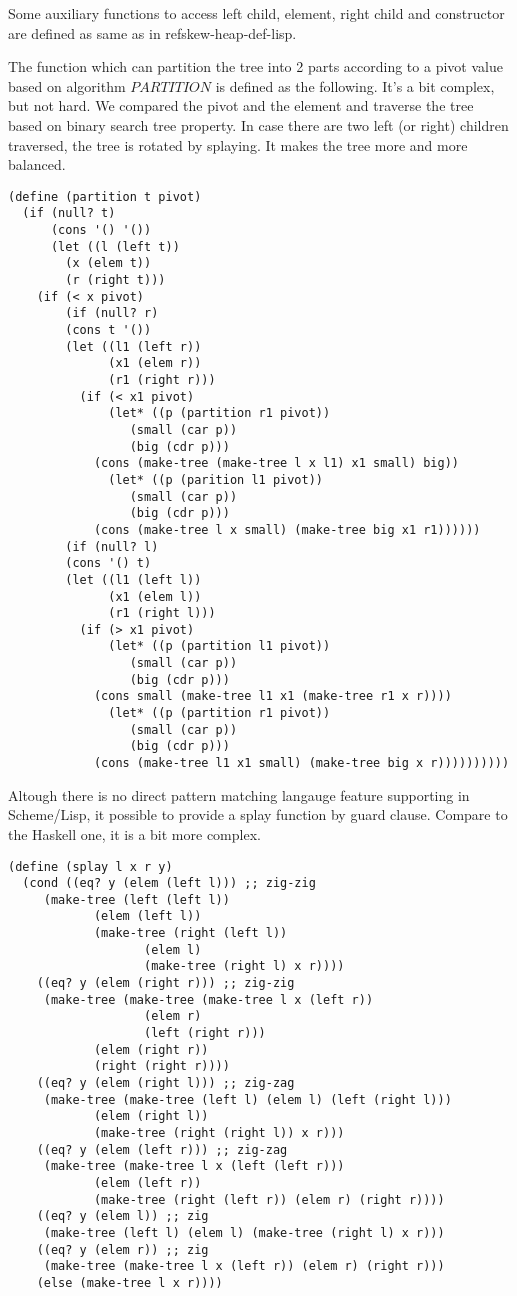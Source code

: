 \documentclass{article}
\begin{document}
Some auxiliary functions to access left child, element, right
child and constructor are defined as same as in ref{skew-heap-def-lisp}.

The function which can partition the tree into 2 parts according to 
a pivot value based on algorithm $PARTITION$ is defined as the following.
It's a bit complex, but not hard. We compared the pivot and the element
and traverse the tree based on binary search tree property. In case
there are two left (or right) children traversed, the tree is rotated
by splaying. It makes the tree more and more balanced.

\lstset{language=lisp}
\begin{lstlisting}
(define (partition t pivot)
  (if (null? t) 
      (cons '() '())
      (let ((l (left t))
	    (x (elem t))
	    (r (right t)))
	(if (< x pivot)
	    (if (null? r)
		(cons t '())
		(let ((l1 (left r))
		      (x1 (elem r))
		      (r1 (right r)))
		  (if (< x1 pivot)
		      (let* ((p (partition r1 pivot))
			     (small (car p))
			     (big (cdr p)))
			(cons (make-tree (make-tree l x l1) x1 small) big))
		      (let* ((p (parition l1 pivot))
			     (small (car p))
			     (big (cdr p)))
			(cons (make-tree l x small) (make-tree big x1 r1))))))
	    (if (null? l)
		(cons '() t)
		(let ((l1 (left l))
		      (x1 (elem l))
		      (r1 (right l)))
		  (if (> x1 pivot)
		      (let* ((p (partition l1 pivot))
			     (small (car p))
			     (big (cdr p)))
			(cons small (make-tree l1 x1 (make-tree r1 x r))))
		      (let* ((p (partition r1 pivot))
			     (small (car p))
			     (big (cdr p)))
			(cons (make-tree l1 x1 small) (make-tree big x r))))))))))
\end{lstlisting}

Altough there is no direct pattern matching langauge feature supporting in
Scheme/Lisp, it possible to provide a splay function by guard clause.
Compare to the Haskell one, it is a bit more complex.

\begin{lstlisting}
(define (splay l x r y)
  (cond ((eq? y (elem (left l))) ;; zig-zig
	 (make-tree (left (left l)) 
		    (elem (left l))
		    (make-tree (right (left l)) 
			       (elem l) 
			       (make-tree (right l) x r))))
	((eq? y (elem (right r))) ;; zig-zig
	 (make-tree (make-tree (make-tree l x (left r))
			       (elem r)
			       (left (right r)))
		    (elem (right r))
		    (right (right r))))
	((eq? y (elem (right l))) ;; zig-zag
	 (make-tree (make-tree (left l) (elem l) (left (right l)))
		    (elem (right l))
		    (make-tree (right (right l)) x r)))
	((eq? y (elem (left r))) ;; zig-zag
	 (make-tree (make-tree l x (left (left r)))
		    (elem (left r))
		    (make-tree (right (left r)) (elem r) (right r))))
	((eq? y (elem l)) ;; zig
	 (make-tree (left l) (elem l) (make-tree (right l) x r)))
	((eq? y (elem r)) ;; zig
	 (make-tree (make-tree l x (left r)) (elem r) (right r)))
	(else (make-tree l x r))))
\end{lstlisting}
\end{document}
